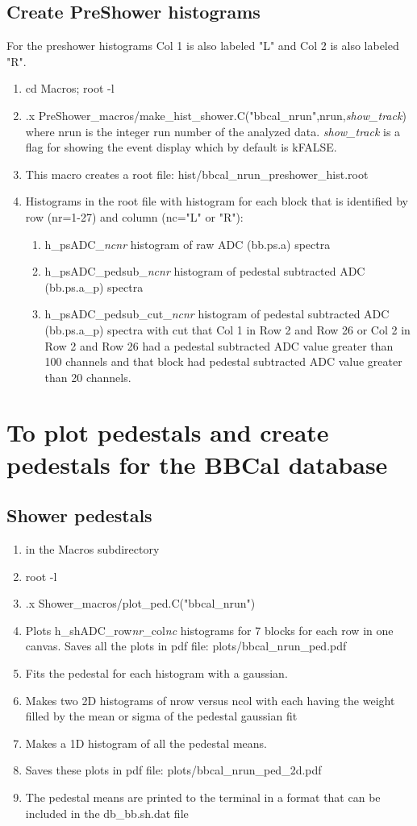 \documentclass[]{article}
\begin{document}
\subsection{Create PreShower histograms}
For the preshower histograms Col 1 is also labeled "L" and Col 2 is also labeled "R".
\begin{enumerate}
	\item cd Macros; root -l
	\item .x PreShower\_macros/make\_hist\_shower.C("bbcal\_nrun",nrun,{\it show\_track}) where nrun  is the integer run number of the analyzed data.  {\it show\_track} is a flag for showing the event display which by default is kFALSE.
	\item This macro creates a root file: hist/bbcal\_nrun\_preshower\_hist.root
	\item Histograms in the root file with histogram for each block that is identified by row (nr=1-27) and column (nc="L" or "R"):
	\begin{enumerate}
		\item h\_psADC\_{\it nc}{\it nr} histogram of raw ADC (bb.ps.a) spectra
		\item h\_psADC\_pedsub\_{\it nc}{\it nr} histogram of pedestal subtracted ADC (bb.ps.a\_p) spectra
		\item h\_psADC\_pedsub\_cut\_{\it nc}{\it nr} histogram of pedestal subtracted ADC (bb.ps.a\_p) spectra with cut that Col 1 in Row 2 and Row 26 or Col 2 in Row 2 and Row 26 had a pedestal subtracted ADC value greater than 100 channels and that block had pedestal subtracted ADC value greater than 20 channels.
	\end{enumerate}
\end{enumerate}
\section{To plot pedestals and create pedestals for the BBCal database}
\subsection{Shower pedestals}
\begin{enumerate}
	\item in the Macros subdirectory
	\item root -l
	\item .x Shower\_macros/plot\_ped.C("bbcal\_nrun")
	\item Plots  h\_shADC\_row{\it nr}\_col{\it nc} histograms for 7 blocks for each row in one canvas. Saves all the plots in pdf file: plots/bbcal\_nrun\_ped.pdf
	\item Fits the pedestal for each histogram with a gaussian.
	\item Makes two 2D histograms of nrow versus ncol with each having the weight filled by the mean or sigma of the pedestal gaussian fit
	\item Makes a 1D histogram of all the pedestal means.
	\item Saves these plots in pdf file: plots/bbcal\_nrun\_ped\_2d.pdf
	\item The pedestal means are printed to the terminal in a format that can be included in the  db\_bb.sh.dat file
\end{enumerate}
\end{document}

